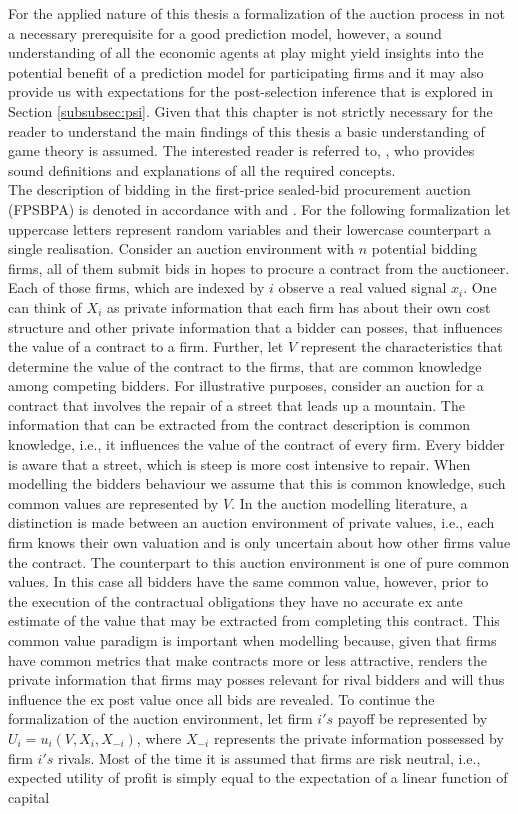 \documentclass[a4paper,12pt, headsepline]{scrartcl}
\numberwithin{equation}{section}
\begin{document}
For the applied nature of this thesis a formalization of the auction process in not a necessary prerequisite 
for a good prediction model, however, a sound understanding of all the economic agents at play might yield insights into the potential benefit of a prediction model for participating firms and it may also provide us with expectations for the post-selection inference that is explored in Section \ref{subsubsec:psi}. Given that this chapter is not strictly necessary for the reader to understand the main findings of this thesis a basic understanding of game theory is assumed. The interested reader is referred to, \citet{tadelis12}, who provides sound definitions and explanations of all the required concepts.\\
The description of bidding in the first-price sealed-bid procurement auction (FPSBPA) is denoted in accordance with \citet{milgrom82} and \citet{HandbookIndustrialOrga}. For the following formalization let uppercase letters represent random variables and their lowercase counterpart a single realisation. Consider an auction environment with $n$ potential bidding firms, all of them submit bids in hopes to procure a contract from the auctioneer. Each of those firms, which are indexed by $i$ observe a real valued signal $x_i$. One can think of $X_i$ as private information that each firm has about their own cost structure and other private information that a bidder can posses, that influences the value of a contract to a firm. Further, let $V$ represent the characteristics that determine the value of the contract to the firms, that are common knowledge among competing bidders. For illustrative purposes, consider an auction for a contract that involves the repair of a street that leads up a mountain. The information that can be extracted from the contract description is common knowledge, i.e., it influences the value of the contract of every firm. Every bidder is aware that a street, which is steep is more cost intensive to repair. When modelling the bidders behaviour we assume that this is common knowledge, such common values are represented by $V$. In the auction modelling literature, a distinction is made between an auction environment of private values, i.e., each firm knows their own valuation and is only uncertain about how other firms value the contract. The counterpart to this auction environment is one of pure common values. In this case all bidders have the same common value, however, prior to the execution of the contractual obligations they have no accurate ex ante estimate of the value that may be extracted from completing this contract. This common value paradigm is important when modelling because, given that firms have common metrics that make contracts more or less attractive, renders the private information that firms may posses relevant for rival bidders and will thus influence the ex post value once all bids are revealed. To continue the formalization of the auction environment, let firm $i's$ payoff be represented by $U_i = u_i(V, X_i, X_{-i})$, where $X_{-i}$ represents the private information possessed by firm $i's$ rivals. Most of the time it is assumed that firms are risk neutral, i.e., expected utility of profit is simply equal to the expectation of a linear function of capital 
\end{document}
